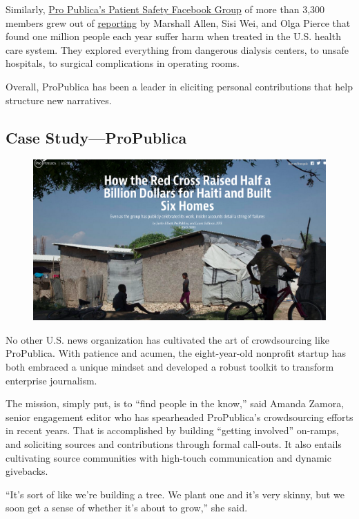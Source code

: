 \documentclass[notoc, symmetric, nobib, nols]{towcenter-guideto-book}
\begin{document}
Similarly, \href{https://www.facebook.com/groups/patientharm}{Pro Publica's Patient Safety Facebook Group} of more than 3,300 members\autocite{Group} grew out of \href{https://www.propublica.org/series/patient-safety}{reporting} by Marshall Allen, Sisi Wei, and Olga Pierce that found one million people each year suffer harm when treated in the U.S. health care system.\autocite{Safety} They explored everything from dangerous dialysis centers, to unsafe hospitals, to surgical complications in operating rooms. 

Overall, ProPublica has been a leader in eliciting personal contributions that help structure new narratives.

\subsection{Case Study---ProPublica}

\begin{figure}
\includegraphics{graphics/RedCross.png}
\end{figure}
 
No other U.S. news organization has cultivated the art of crowdsourcing like ProPublica. With patience and acumen, the eight-year-old nonprofit startup has both embraced a unique mindset and developed a robust toolkit to transform enterprise journalism.

The mission, simply put, is to ``find people in the know,'' said Amanda Zamora, senior engagement editor who has spearheaded ProPublica's crowdsourcing efforts in recent years. That is accomplished by building ``getting involved'' on-ramps, and soliciting sources and contributions through formal call-outs. It also entails cultivating source communities with high-touch communication and dynamic givebacks.

``It's sort of like we're building a tree. We plant one and it's very skinny, but we soon get a sense of whether it's about to grow,'' she said.%
\end{document}
